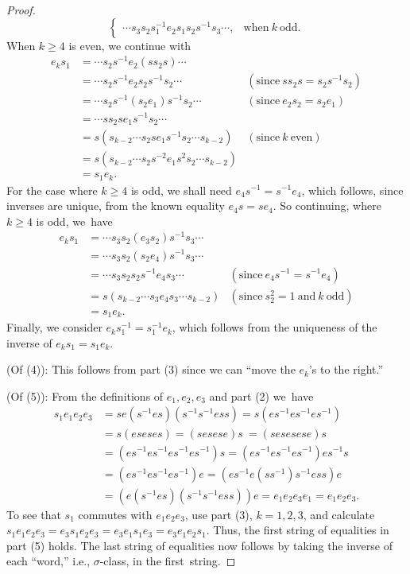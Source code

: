 \documentclass{surv-l}
\numberwithin{equation}{section}
\numberwithin{table}{section}
\numberwithin{figure}{section}
\theoremstyle{definition}
\begin{document}
\begin{proof}
\[\begin{cases}
\cdots s_{3}s_{2}s_{1}^{-1}e_{2}s_{1}s_{2}s^{-1}s_{3}\cdots, &\mathrm{when}\ k\ \mathrm{odd}.
\end{cases}
\]
When $k\geq 4$ is even, we continue with
\[
\begin{array}{lll}
e_{k}s_{1}&=\cdots s_{2}s^{-1}e_{2}(ss_{2}s)\cdots & \\
&=\cdots s_{2}s^{-1}e_{2}s_{2}s^{-1}s_{2}\cdots &(\mathrm{since}\ ss_2s =s_{2}s^{-1}s_{2}) \\
&=\cdots s_{2}s^{-1}(s_{2}e_{1})s^{-1}s_{2}\cdots &(\mathrm{since}\
e_{2}s_{2}=s_{2}e_{1}) \\
&=\cdots ss_{2}se_{1}s^{-1}s_{2}\cdots \\
&=s(s_{k-2}\cdots s_{2}se_{1}s^{-1}s_{2}\cdots s_{k-2}) &(\mathrm{since}\
k\ \mathrm{even}) \\
&=s(s_{k-2}\cdots s_{2}s^{-2}e_{1}s^{2}s_{2}\cdots s_{k-2}) \\
&=s_{1}e_{k}.
\end{array}
\]
For the case where $k\geq 4$ is odd, we shall need
$e_{4}s^{-1}=s^{-1}e_{4}$, which follows, since inverses are
unique, from the known equality $e_{4}s=se_{4}$. So
continuing, where $k\geq 4$ is odd, we~have
\[
\begin{array}{lll}
e_{k}s_{1}&=\cdots s_{3}s_{2}(e_{3}s_{2})s^{-1}s_{3}\cdots & \\
&=\cdots s_{3}s_{2}(s_{2}e_{4})s^{-1}s_{3}\cdots & \\
&=\cdots s_{3}s_{2}s_{2}s^{-1}e_{4}s_{3}\cdots &(\mathrm{since}\ e_{4}s^{-1}=s^{-1}e_{4}) \\
&=s(s_{k-2}\cdots s_3e_{4}s_{3}\cdots s_{k-2}) &(\mathrm{since}\ s_{2}^{2}=1\ \mathrm{and}\ k\ \mathrm{odd}) \\
&=s_{1}e_{k}. &
\end{array}
\]
Finally, we consider $e_{k}s_{1}^{-1}=s_{1}^{-1}e_{k}$, which
follows from the uniqueness of the inverse of
$e_{k}s_{1}=s_{1}e_{k}$.

\noindent (Of (4)): This follows from part (3) since we can ``move the
$e_{k}$'s to the right.''

\noindent (Of (5)): From the definitions of $e_{1}, e_{2}, e_{3}$ and part (2) we~have
\begin{align*}
s_{1}e_{1}e_{2}e_{3}&=se(s^{-1}es)(s^{-1}s^{-1}ess)=s(es^{-1}es^{-1}es^{-1}) \\
&=s(eseses)=(sesese)s\ =(sesesese)s \\
&=(es^{-1}es^{-1}es^{-1}es^{-1})s=(es^{-1}es^{-1}es^{-1})es^{-1}s \\
&=(es^{-1}es^{-1}es^{-1})e=(es^{-1}e(ss^{-1})s^{-1}ess)e \\
&=(e(s^{-1}es)(s^{-1}s^{-1}ess))e=e_{1}e_{2}e_{3}e_{1}=e_{1}e_{2}e_{3}.
\end{align*}
To see that $s_1$ commutes with $e_{1}e_{2}e_{3}$, use part
(3), $k=1,2,3$, and calculate
$s_{1}e_{1}e_{2}e_{3}=e_{3}s_{1}e_{2}e_{3}=e_{3}e_{1}s_{1}e_{3}=e_{3}e_{1}e_{2}s_{1}$.
Thus, the first string of equalities in part (5) holds. The
last string of equalities now follows by taking the inverse of
each ``word,'' i.e., $\sigma$-class, in the first~string.
\end{proof}
\end{document}

